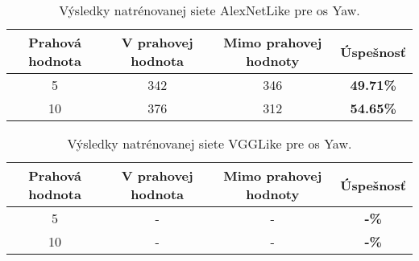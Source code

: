 \begin{table}[H]
    \centering
    \begin{tabular}{|c|c|c|c|}
        \hline
        Prahová hodnota & V prahovej hodnota       & Mimo prahovej hodnoty    & Úspešnosť    \\ \hline
        5               & {\color[HTML]{009901} 342} & {\color[HTML]{9A0000} 346} & \textbf{49.71\%} \\ \hline
        10              & {\color[HTML]{009901} 376} & {\color[HTML]{9A0000} 312} & \textbf{54.65\%} \\ \hline
    \end{tabular}
    \caption{Výsledky natrénovanej siete AlexNetLike pre os Yaw.}
    \label{tab:alexnetyawresults}
\end{table}
\begin{table}[H]
    \centering
    \begin{tabular}{|c|c|c|c|}
        \hline
        Prahová hodnota & V prahovej hodnota       & Mimo prahovej hodnoty    & Úspešnosť    \\ \hline
        5               & {\color[HTML]{009901} -} & {\color[HTML]{9A0000} -} & \textbf{-\%} \\ \hline
        10              & {\color[HTML]{009901} -} & {\color[HTML]{9A0000} -} & \textbf{-\%} \\ \hline
    \end{tabular}
    \caption{Výsledky natrénovanej siete VGGLike pre os Yaw.}
    \label{tab:vgglikeyawresults}
\end{table}
